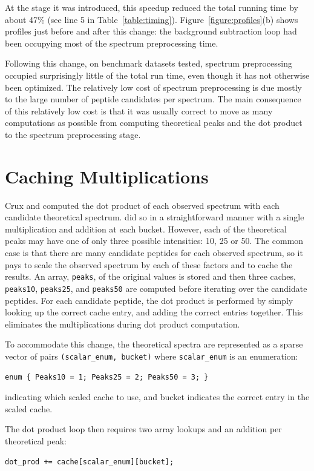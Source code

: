 At the stage it was introduced, this speedup reduced the total running
time by about 47\% (see line 5 in Table~\ref{table:timing}).
Figure~\ref{figure:profiles}(b) shows profiles just before and after this
change: the background subtraction loop had been occupying most of the
spectrum preprocessing time.

Following this change, on benchmark datasets tested, spectrum
preprocessing occupied surprisingly little of the total run time, even
though it has not otherwise been optimized. The relatively low cost of
spectrum preprocessing is due mostly to the large number of peptide
candidates per spectrum. The main consequence of this relatively low
cost is that it was usually correct to move as many computations as
possible from computing theoretical peaks and the dot product to the
spectrum preprocessing stage.

\section{Caching Multiplications}

Crux and \tidezero computed the dot product of each observed spectrum
with each candidate theoretical spectrum. \tidezero did so in a
straightforward manner with a single multiplication and addition at
each bucket. However, each of the theoretical peaks may have one of
only three possible intensities: 10, 25 or 50. The common case is that
there are many candidate peptides for each observed spectrum, so it
pays to scale the observed spectrum by each of these factors and to
cache the results. An array, {\tt peaks}, of the original values is
stored and then three caches, {\tt peaks10}, {\tt peaks25}, and
{\tt peaks50} are computed before iterating over the candidate
peptides. For each candidate peptide, the dot product is performed by
simply looking up the correct cache entry, and adding the correct
entries together. This eliminates the multiplications during dot
product computation.

To accommodate this change, the theoretical spectra are represented as
a sparse vector of pairs {\tt (scalar\_enum, bucket)} where
{\tt scalar\_enum} is an enumeration:
\begin{verbatim}
enum { Peaks10 = 1; Peaks25 = 2; Peaks50 = 3; }
\end{verbatim}
indicating which scaled cache to use, and bucket indicates the correct
entry in the scaled cache.

The dot product loop then requires two array lookups and an addition
per theoretical peak:
\begin{verbatim}
dot_prod += cache[scalar_enum][bucket];
\end{verbatim}


